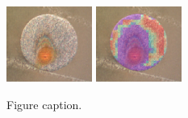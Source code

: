 \documentclass[3p]{elsarticle}
\begin{document}
\begin{figure}[H]
\includegraphics[width=0.25\textwidth]{img1.png}
\hspace{2cm}
\includegraphics[width=0.25\textwidth]{img2.png}

\caption{Figure caption.}
\label{fig:deconvolution}
\end{figure}
\end{document}
